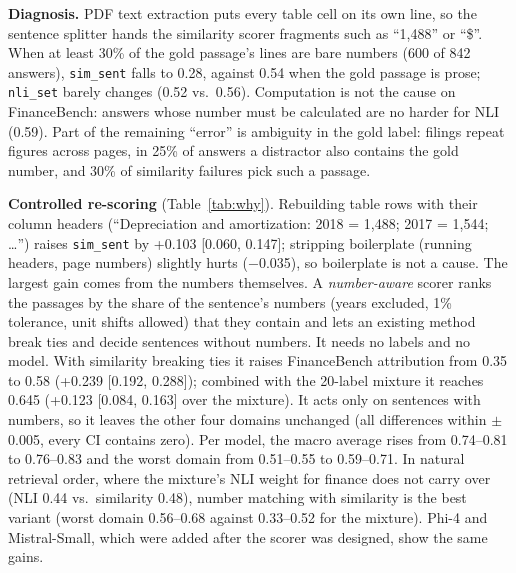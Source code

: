 \documentclass[conference]{IEEEtran}
\newcommand{\m}[1]{\texttt{#1}}   %
\begin{document}
\textbf{Diagnosis.} PDF text extraction puts every table cell on its own line, so the sentence splitter hands the similarity scorer fragments such as
``1,488'' or ``\$''. When at least 30\% of the gold passage's lines are bare numbers (600 of 842 answers), \m{sim\_sent} falls to 0.28, against 0.54
when the gold passage is prose; \m{nli\_set} barely changes (0.52 vs.\ 0.56). Computation is not the cause on FinanceBench: answers whose number
must be calculated are no harder for NLI (0.59). Part of the remaining ``error'' is ambiguity in the gold label: filings repeat figures across pages,
in 25\% of answers a distractor also contains the gold number, and 30\% of similarity failures pick such a passage.

\textbf{Controlled re-scoring} (Table~\ref{tab:why}). Rebuilding table rows with their column headers (``Depreciation and amortization: 2018 = 1,488;
2017 = 1,544; \dots'') raises \m{sim\_sent} by +0.103 [0.060, 0.147]; stripping boilerplate (running headers, page numbers) slightly hurts
($-$0.035), so boilerplate is not a cause. The largest gain comes from the numbers themselves. A \emph{number-aware} scorer ranks the passages by the
share of the sentence's numbers (years excluded, 1\% tolerance, unit shifts allowed) that they contain and lets an existing method break ties and
decide sentences without numbers. It needs no labels and no model. With similarity breaking ties it raises FinanceBench attribution from 0.35 to
0.58 (+0.239 [0.192, 0.288]); combined with the 20-label mixture it reaches 0.645 (+0.123 [0.084, 0.163] over the mixture). It acts only on sentences
with numbers, so it leaves the other four domains unchanged (all differences within $\pm$0.005, every CI contains zero). Per model, the macro average
rises from 0.74--0.81 to 0.76--0.83 and the worst domain from 0.51--0.55 to 0.59--0.71. In natural retrieval order, where the mixture's NLI weight
for finance does not carry over (NLI 0.44 vs.\ similarity 0.48), number matching with similarity is the best variant (worst domain 0.56--0.68 against
0.33--0.52 for the mixture). Phi-4 and Mistral-Small, which were added after the scorer was designed, show the same gains.
\end{document}
